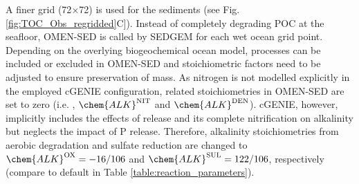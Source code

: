 \documentclass[gmd, manuscript]{copernicus}
\begin{document}
A finer grid (72$\times$72) is used for the sediments (see Fig. \ref{fig:TOC_Obs_regridded}C]). 
Instead of completely degrading POC at the seafloor, OMEN-SED is called by SEDGEM for each wet ocean grid point. 
Depending on the overlying biogeochemical ocean model, processes can be included or excluded in OMEN-SED and stoichiometric factors need to be adjusted to ensure preservation of mass. 
As nitrogen is not modelled explicitly in the employed cGENIE configuration, related stoichiometries in OMEN-SED are set to zero (i.e. , $\chem{ALK}^\mathrm{NIT}$ and $\chem{ALK}^\mathrm{DEN}$). 
cGENIE, however, implicitly includes the effects of  release and its complete nitrification on alkalinity but neglects the impact of P release. Therefore, alkalinity 
stoichiometries from aerobic degradation and sulfate reduction are changed to $\chem{ALK}^\mathrm{OX} = -16/106$ and $\chem{ALK}^\mathrm{SUL} = 122/106$, respectively (compare to default in Table \ref{table:reaction_parameters}).
\end{document}
